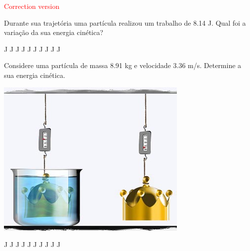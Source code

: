 \documentclass[12pt, addpoints]{exam}
\begin{document}
\begin{center}
\textcolor{red}{\emph\Large Correction version}\end{center}
\begin{questions}
\begin{multicols}{2}
\question[33] Durante sua trajetória uma partícula realizou um trabalho de    8.14 J. Qual foi a variação da sua energia cinética?

\begin{oneparchoices}
 J J J J J J J J J J\end{oneparchoices}

\begin{oneparchoices}
\end{oneparchoices}
\question[23] Considere uma partícula de massa    8.91 kg e velocidade    3.36 m/s. Determine a sua energia cinética.

\begin{center}
\begin{minipage}[c]{0.75\linewidth}
\includegraphics[width=\textwidth]{MWE001.jpg}
\end{minipage}

\end{center}
\begin{oneparchoices}
 J J J J J J J J J J\end{oneparchoices}

\begin{oneparchoices}
\end{oneparchoices}
\end{multicols}
\end{questions}
\newpage
\end{document}
